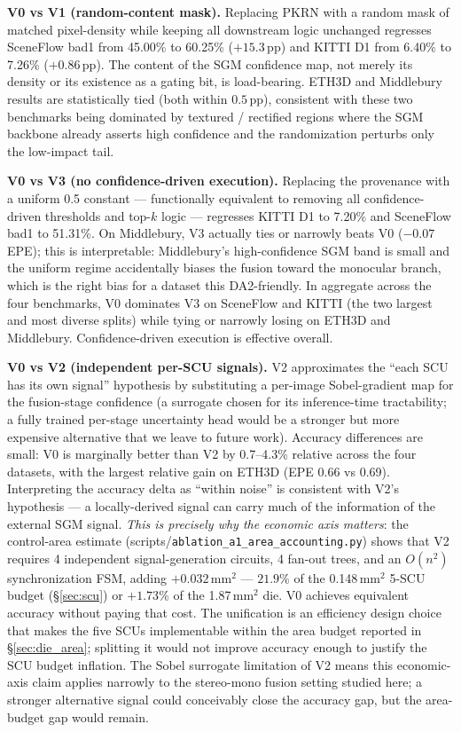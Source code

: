 \documentclass[journal]{IEEEtran}
\begin{document}


\textbf{V0 vs V1 (random-content mask).} Replacing PKRN with a random mask of matched pixel-density while keeping all downstream logic unchanged regresses SceneFlow bad1 from 45.00\% to 60.25\% ($+15.3$\,pp) and KITTI D1 from 6.40\% to 7.26\% ($+0.86$\,pp). The content of the SGM confidence map, not merely its density or its existence as a gating bit, is load-bearing. ETH3D and Middlebury results are statistically tied (both within $0.5$\,pp), consistent with these two benchmarks being dominated by textured / rectified regions where the SGM backbone already asserts high confidence and the randomization perturbs only the low-impact tail.

\textbf{V0 vs V3 (no confidence-driven execution).} Replacing the provenance with a uniform 0.5 constant --- functionally equivalent to removing all confidence-driven thresholds and top-$k$ logic --- regresses KITTI D1 to 7.20\% and SceneFlow bad1 to 51.31\%. On Middlebury, V3 actually ties or narrowly beats V0 ($-0.07$ EPE); this is interpretable: Middlebury's high-confidence SGM band is small and the uniform regime accidentally biases the fusion toward the monocular branch, which is the right bias for a dataset this DA2-friendly. In aggregate across the four benchmarks, V0 dominates V3 on SceneFlow and KITTI (the two largest and most diverse splits) while tying or narrowly losing on ETH3D and Middlebury. Confidence-driven execution is effective overall.

\textbf{V0 vs V2 (independent per-SCU signals).} V2 approximates the ``each SCU has its own signal'' hypothesis by substituting a per-image Sobel-gradient map for the fusion-stage confidence (a surrogate chosen for its inference-time tractability; a fully trained per-stage uncertainty head would be a stronger but more expensive alternative that we leave to future work). Accuracy differences are small: V0 is marginally better than V2 by 0.7--4.3\% relative across the four datasets, with the largest relative gain on ETH3D (EPE 0.66 vs 0.69). Interpreting the accuracy delta as ``within noise'' is consistent with V2's hypothesis --- a locally-derived signal can carry much of the information of the external SGM signal. \emph{This is precisely why the economic axis matters}: the control-area estimate (scripts/\texttt{ablation\_a1\_area\_accounting.py}) shows that V2 requires 4 independent signal-generation circuits, 4 fan-out trees, and an $O(n^2)$ synchronization FSM, adding $+0.032$\,mm$^2$ --- $21.9$\% of the 0.148\,mm$^2$ 5-SCU budget (\S\ref{sec:scu}) or $+1.73$\% of the 1.87\,mm$^2$ die. V0 achieves equivalent accuracy without paying that cost. The unification is an efficiency design choice that makes the five SCUs implementable within the area budget reported in \S\ref{sec:die_area}; splitting it would not improve accuracy enough to justify the SCU budget inflation. The Sobel surrogate limitation of V2 means this economic-axis claim applies narrowly to the stereo-mono fusion setting studied here; a stronger alternative signal could conceivably close the accuracy gap, but the area-budget gap would remain.
\end{document}

